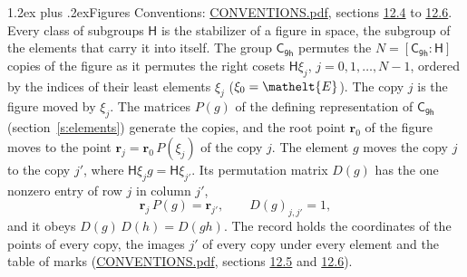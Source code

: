 \documentclass[10pt,a4paper]{article}
\makeatletter
\renewcommand\section{\@startsection{section}{1}{\z@}{-3ex plus -1ex minus -.2ex}%
  {1.2ex plus .2ex}{\normalfont\large\sffamily\bfseries\color{parttitle}}}
\numberwithin{equation}{section}
\newcommand{\eltfont}[1]{{\let\sigma\eltsigma\mathelt{#1}}}
\newcommand{\grp}[1]{\mathsf{#1}}
\newcommand{\cls}[1]{\eltfont{#1}}
\newcommand{\pointr}{\mathbf{r}}
\makeatother
\begin{document}
\section{Figures}\label{s:permutation}
Conventions: \href{../../CONVENTIONS.pdf}{CONVENTIONS.pdf}, sections \href{../../CONVENTIONS.pdf\#conv.12.4}{12.4} to \href{../../CONVENTIONS.pdf\#conv.12.6}{12.6}.
Every class of subgroups $\grp{H}$ is the stabilizer of a figure in space, the subgroup of the elements that carry it into itself. \label{n:local.orbit.size}\label{n:element.coset.least}\label{n:index.coset}The group $\grp{C_{9h}}$ permutes the $N = [\grp{C_{9h}} : \grp{H}]$ copies of the figure as it permutes the right cosets $\grp{H}\xi_j$, $j = 0, 1, \dots, N - 1$, ordered by the indices of their least elements $\xi_j$ ($\xi_0 = \cls{E}$). The copy $j$ is the figure moved by $\xi_j$. The matrices $P(g)$ of the defining representation of $\grp{C_{9h}}$ (section~\ref{s:elements}) generate the copies, and the root point $\pointr_0$ of the figure moves to the point $\pointr_j = \pointr_0\, P(\xi_j)$ of the copy $j$. \label{n:local.coset.image}The element $g$ moves the copy $j$ to the copy $j'$, where $\grp{H}\xi_j g = \grp{H}\xi_{j'}$. \label{n:local.matrix.permutation}Its permutation matrix $D(g)$ has the one nonzero entry of row $j$ in column $j'$,
\begin{equation}\label{e:perm.matrix}\pointr_j\, P(g) = \pointr_{j'}, \qquad D(g)_{j,j'} = 1,\end{equation}
and it obeys $D(g)\, D(h) = D(gh)$. The record holds the coordinates of the points of every copy, the images $j'$ of every copy under every element and the table of marks (\href{../../CONVENTIONS.pdf}{CONVENTIONS.pdf}, sections \href{../../CONVENTIONS.pdf\#conv.12.5}{12.5} and \href{../../CONVENTIONS.pdf\#conv.12.6}{12.6}).
\end{document}
